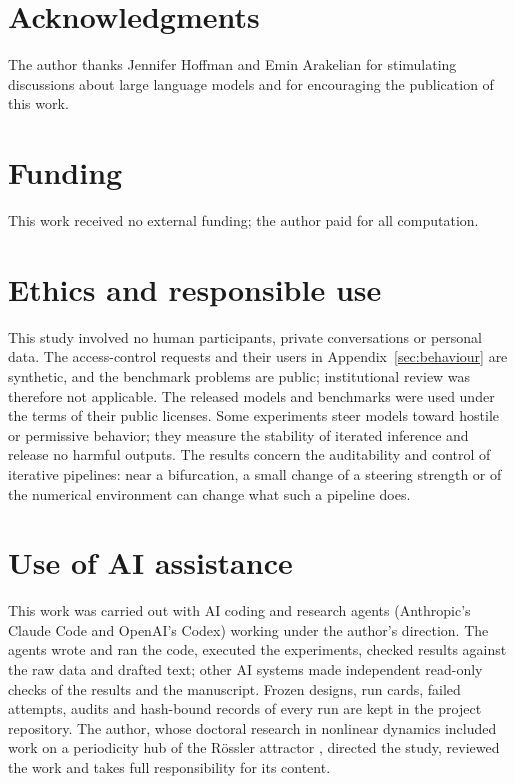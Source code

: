 \documentclass[11pt,letterpaper]{article}
\begin{document}
\section*{Acknowledgments}
The author thanks Jennifer Hoffman and Emin Arakelian for stimulating discussions about large language models and
for encouraging the publication of this work.

\section*{Funding}
This work received no external funding; the author paid for all computation.

\section*{Ethics and responsible use}
This study involved no human participants, private conversations or personal data. The access-control requests and
their users in Appendix~\ref{sec:behaviour} are synthetic, and the benchmark problems are public; institutional review
was therefore not applicable. The released models and benchmarks were used under the terms of their public licenses.
Some experiments steer models toward hostile or permissive behavior; they measure the stability of iterated inference
and release no harmful outputs. The results concern the auditability and control of iterative pipelines: near a
bifurcation, a small change of a steering strength or of the numerical environment can change what such a pipeline
does.

\section*{Use of AI assistance}
This work was carried out with AI coding and research agents (Anthropic's Claude Code and OpenAI's Codex) working
under the author's direction. The agents wrote and ran the code, executed the experiments, checked results against
the raw data and drafted text; other AI systems made independent read-only checks of the results and the
manuscript. Frozen designs, run cards, failed attempts, audits and hash-bound records of every run are kept in the
project repository. The author, whose doctoral research in nonlinear dynamics included work on a periodicity hub of the
R\"ossler attractor \cite{jones2012rossler}, directed the study, reviewed the work and takes full responsibility for
its content.



\clearpage
\appendix
\end{document}
